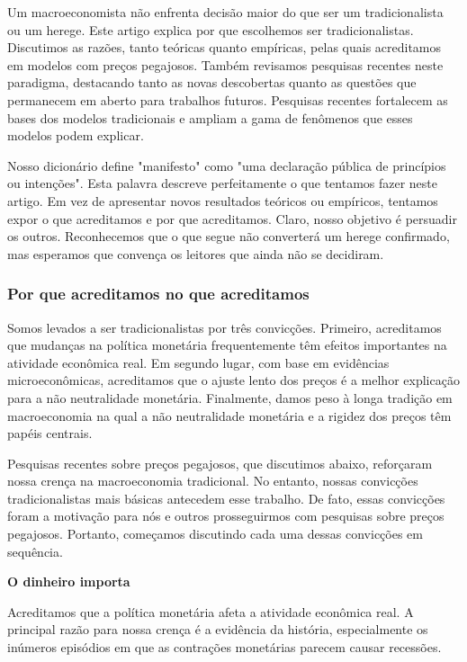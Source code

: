 \documentclass[12pt]{article}
\begin{document}
Um macroeconomista não enfrenta decisão maior do que ser um tradicionalista ou um herege. Este artigo explica por que escolhemos ser tradicionalistas. Discutimos as razões, tanto teóricas quanto empíricas, pelas quais acreditamos em modelos com preços pegajosos. Também revisamos pesquisas recentes neste paradigma, destacando tanto as novas descobertas quanto as questões que permanecem em aberto para trabalhos futuros. Pesquisas recentes fortalecem as bases dos modelos tradicionais e ampliam a gama de fenômenos que esses modelos podem explicar.

Nosso dicionário define "manifesto" como "uma declaração pública de princípios ou intenções". Esta palavra descreve perfeitamente o que tentamos fazer neste artigo. Em vez de apresentar novos resultados teóricos ou empíricos, tentamos expor o que acreditamos e por que acreditamos. Claro, nosso objetivo é persuadir os outros. Reconhecemos que o que segue não converterá um herege confirmado, mas esperamos que convença os leitores que ainda não se decidiram.

\subsubsection{\textbf{Por que acreditamos no que acreditamos}}

Somos levados a ser tradicionalistas por três convicções. Primeiro, acreditamos que mudanças na política monetária frequentemente têm efeitos importantes na atividade econômica real. Em segundo lugar, com base em evidências microeconômicas, acreditamos que o ajuste lento dos preços é a melhor explicação para a não neutralidade monetária. Finalmente, damos peso à longa tradição em macroeconomia na qual a não neutralidade monetária e a rigidez dos preços têm papéis centrais.

Pesquisas recentes sobre preços pegajosos, que discutimos abaixo, reforçaram nossa crença na macroeconomia tradicional. No entanto, nossas convicções tradicionalistas mais básicas antecedem esse trabalho. De fato, essas convicções foram a motivação para nós e outros prosseguirmos com pesquisas sobre preços pegajosos. Portanto, começamos discutindo cada uma dessas convicções em sequência.

\textbf{O dinheiro importa}

Acreditamos que a política monetária afeta a atividade econômica real. A principal razão para nossa crença é a evidência da história, especialmente os inúmeros episódios em que as contrações monetárias parecem causar recessões.
\end{document}
